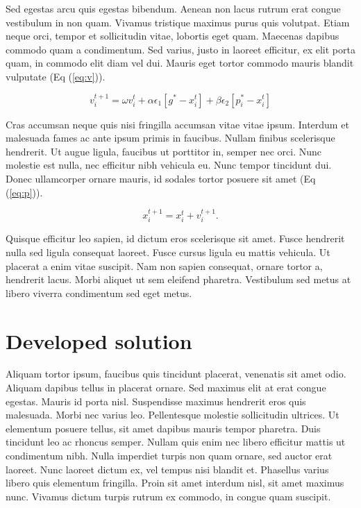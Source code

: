 \documentclass[final,5p,times,twocolumn]{elsarticle}
\begin{document}
Sed egestas arcu quis egestas bibendum. Aenean non lacus rutrum erat congue vestibulum in non quam. Vivamus tristique maximus purus quis volutpat. Etiam neque orci, tempor et sollicitudin vitae, lobortis eget quam. Maecenas dapibus commodo quam a condimentum. Sed varius, justo in laoreet efficitur, ex elit porta quam, in commodo elit diam vel dui. Mauris eget tortor commodo mauris blandit vulputate (Eq (\ref{eq:v})). 

\begin{equation}\label{eq:v}
v_{i}^{t+1} = \omega v_{i}^{t} + \alpha \epsilon_{1} [g^{*} - x_{i}^{t}] + \beta \epsilon_{2}[p_{i}^{*} - x_{i}^{t}]
\end{equation}

Cras accumsan neque quis nisi fringilla accumsan vitae vitae ipsum. Interdum et malesuada fames ac ante ipsum primis in faucibus. Nullam finibus scelerisque hendrerit. Ut augue ligula, faucibus ut porttitor in, semper nec orci. Nunc molestie est nulla, nec efficitur nibh vehicula eu. Nunc tempor tincidunt dui. Donec ullamcorper ornare mauris, id sodales tortor posuere sit amet (Eq (\ref{eq:p})).

\begin{equation}\label{eq:p}
x_{i}^{t+1} = x_{i}^{t} + v_{i}^{t+1}.
\end{equation}

Quisque efficitur leo sapien, id dictum eros scelerisque sit amet. Fusce hendrerit nulla sed ligula consequat laoreet. Fusce cursus ligula eu mattis vehicula. Ut placerat a enim vitae suscipit. Nam non sapien consequat, ornare tortor a, hendrerit lacus. Morbi aliquet ut sem eleifend pharetra. Vestibulum sed metus at libero viverra condimentum sed eget metus.

\section{Developed solution} 
\label{sec:ds}

Aliquam tortor ipsum, faucibus quis tincidunt placerat, venenatis sit amet odio. Aliquam dapibus tellus in placerat ornare. Sed maximus elit at erat congue egestas. Mauris id porta nisl. Suspendisse maximus hendrerit eros quis malesuada. Morbi nec varius leo. Pellentesque molestie sollicitudin ultrices. Ut elementum posuere tellus, sit amet dapibus mauris tempor pharetra. Duis tincidunt leo ac rhoncus semper. Nullam quis enim nec libero efficitur mattis ut condimentum nibh. Nulla imperdiet turpis non quam ornare, sed auctor erat laoreet. Nunc laoreet dictum ex, vel tempus nisi blandit et. Phasellus varius libero quis elementum fringilla. Proin sit amet interdum nisl, sit amet maximus nunc. Vivamus dictum turpis rutrum ex commodo, in congue quam suscipit.
\end{document}
